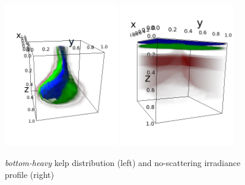 \documentclass[ms,cpyr,lof,lot]{uathesis}
\begin{document}
\begin{figure}[H]
  \centering
  \vspace{-3em}
  \includegraphics[width=0.45\textwidth]{bottom-heavy_kelp}
  \includegraphics[width=0.45\textwidth]{bottom-heavy_irrad}
  \caption{\textit{bottom-heavy} kelp distribution (left) and no-scattering irradiance profile (right)}
\end{figure}
\end{document}
